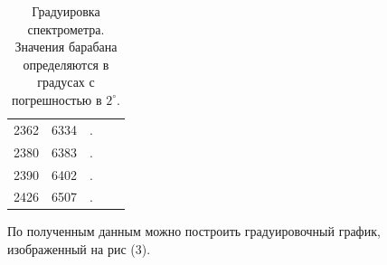\documentclass[a4paper, 14pt]{extarticle}%
\newcommand\ECaption[1]{%
     \captionsetup{font=footnotesize}%
     \caption{#1}}
\begin{document}
\begin{table}[h]
\begin{center}
\begin{tabular}{|cc|c|cc}
\multicolumn{1}{|c|}{2362}                                                           & 6334                         & \cellcolor[HTML]{9698ED}. &                                                                                     &                                                   \\ \cline{1-3}
\multicolumn{1}{|c|}{\cellcolor[HTML]{9698ED}2380}                                   & \cellcolor[HTML]{9698ED}6383 & \cellcolor[HTML]{9698ED}. &                                                                                     &                                                   \\ \cline{1-3}
\multicolumn{1}{|c|}{2390}                                                           & 6402                         & \cellcolor[HTML]{9698ED}. &                                                                                     &                                                   \\ \cline{1-3}
\multicolumn{1}{|c|}{\cellcolor[HTML]{9698ED}2426}                                   & \cellcolor[HTML]{9698ED}6507 & \cellcolor[HTML]{9698ED}. &                                                                                     &                                                   \\ \cline{1-3}
\end{tabular}
\ECaption{Градуировка спектрометра. Значения барабана определяются в градусах с погрешностью в $2^{\circ}$.}
\end{center}
\end{table}

По полученным данным можно построить градуировочный график, изображенный на рис (3).
\end{document}
